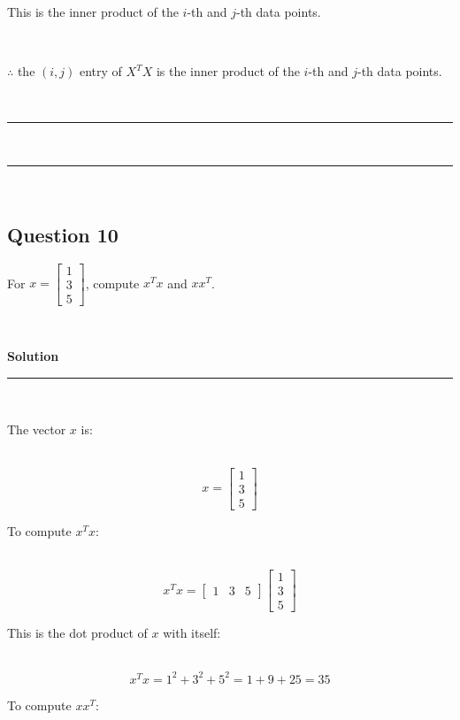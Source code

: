 \documentclass{article}
\begin{document}
\parbox{\textwidth}{This is the inner product of the $i$-th and $j$-th data points.}\\

\parbox{\textwidth}{$\therefore$ the $(i,j)$ entry of ${X}^TX$ is the inner product of the $i$-th and $j$-th data points.}\\

\noindent\rule{\textwidth}{0.4pt}\\
\noindent\rule{\textwidth}{0.4pt}\\

\newpage

\subsection*{Question 10}

\parbox{\textwidth}{For $x = \begin{bmatrix} 1\\ 3 \\ 5 \end{bmatrix}$, compute $x^Tx$ and $xx^T$.}\\

\parbox{\textwidth}{\textbf{Solution}}

\noindent\rule{\textwidth}{0.4pt}\\

\parbox{\textwidth}{The vector $x$ is:}\\

$$x = \begin{bmatrix} 1 \\ 3 \\ 5 \end{bmatrix}$$

\parbox{\textwidth}{To compute $x^Tx$:}\\

$$x^Tx = \begin{bmatrix} 1 & 3 & 5 \end{bmatrix} \begin{bmatrix} 1 \\ 3 \\ 5 \end{bmatrix}$$

\parbox{\textwidth}{This is the dot product of $x$ with itself:}\\

$$x^Tx = 1^2 + 3^2 + 5^2 = 1 + 9 + 25 = 35$$

\parbox{\textwidth}{To compute $xx^T$:}\\
\end{document}
